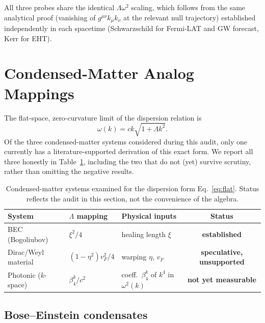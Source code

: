 \documentclass[12pt,a4paper]{article}
\begin{document}
All three probes share the identical $\Lambda\omega^2$ scaling, which
follows from the same analytical proof (vanishing of $g^{\mu\nu}k_\mu
k_\nu$ at the relevant null trajectory) established independently in
each spacetime (Schwarzschild for Fermi-LAT and GW forecast, Kerr for
EHT).

\section{Condensed-Matter Analog Mappings}
\label{sec:analogs}

The flat-space, zero-curvature limit of the dispersion relation is
\begin{equation}\label{eq:flat}
  \omega(k) = ck\sqrt{1+\Lambda k^2}.
\end{equation}
Of the three condensed-matter systems considered during this audit, only
one currently has a literature-supported derivation of this exact form.
We report all three honestly in Table~\ref{tab:mappings}, including the
two that do not (yet) survive scrutiny, rather than omitting the
negative results.

\begin{table}[h]
\centering
\caption{Condensed-matter systems examined for the dispersion form
Eq.~\eqref{eq:flat}. Status reflects the audit in this section, not the
convenience of the algebra.}
\label{tab:mappings}
\begin{tabular}{lllc}
\toprule
System & $\Lambda$ mapping & Physical inputs & Status \\
\midrule
BEC (Bogoliubov)     & $\xi^2/4$              & healing length $\xi$ & \textbf{established} \\
Dirac/Weyl material  & $(1-\eta^2)v_F^2/4$    & warping $\eta$, $v_F$ & \textbf{speculative, unsupported} \\
Photonic ($k$-space) & $\beta_4^k/c^2$        & coeff.\ $\beta_4^k$ of $k^4$ in $\omega^2(k)$ & \textbf{not yet measurable} \\
\bottomrule
\end{tabular}
\end{table}

\subsection{Bose--Einstein condensates}
\end{document}
